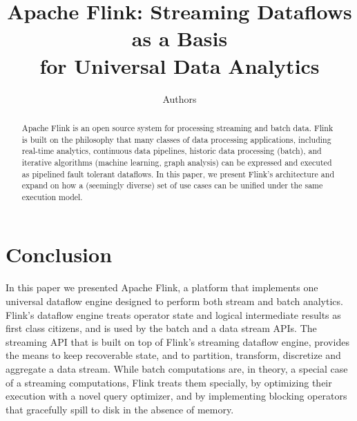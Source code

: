 \documentclass[11pt]{article}
\begin{document}
\title{Apache Flink\texttrademark : Streaming Dataflows as a Basis \\ for Universal Data Analytics}
\author{Authors}

\maketitle

\begin{abstract}
Apache Flink is an open source system for processing streaming and batch data. Flink is built on the philosophy that many classes of data processing applications, including real-time analytics, continuous data pipelines, historic data processing (batch), and iterative algorithms (machine learning, graph analysis) can be expressed and executed as pipelined fault tolerant dataflows. In this paper, we present Flink’s architecture and expand on how a (seemingly diverse) set of use cases can be unified under the same execution model.
\end{abstract}









\section{Conclusion}
\label{sec:conclusions}
In this paper we presented Apache Flink, a platform that implements one universal dataflow engine designed to perform both stream and batch analytics. Flink's dataflow engine treats operator state and logical intermediate results as first class citizens, and is used by the batch and a data stream APIs. The streaming API that is built on top of  Flink's streaming dataflow engine, provides the means to keep recoverable state, and to partition, transform, discretize and aggregate a data stream. While batch computations are, in theory, a special case of a streaming computations, Flink treats them specially, by optimizing their execution with a novel query optimizer, and by implementing blocking operators that gracefully spill to disk in the absence of memory. 



\end{document}

